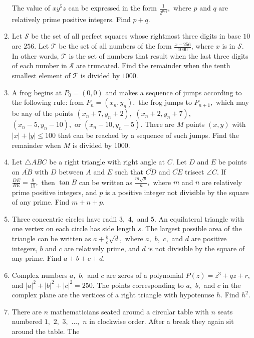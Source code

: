 \documentclass{article}
\begin{document}
\begin{enumerate}[label=\arabic*., itemsep=0.5em]
The value of \(xy^5z\) can be expressed in the form \(\frac{1}{2^{p/q}},\) where \(p\) and \(q\) are relatively prime positive integers. Find \(p+q.\)\par \vspace{0.5em}\item Let \(\mathcal{S}\) be the set of all perfect squares whose rightmost three digits in base \(10\) are \(256\). Let \(\mathcal{T}\) be the set of all numbers of the form \(\frac{x-256}{1000}\), where \(x\) is in \(\mathcal{S}\). In other words, \(\mathcal{T}\) is the set of numbers that result when the last three digits of each number in \(\mathcal{S}\) are truncated. Find the remainder when the tenth smallest element of \(\mathcal{T}\) is divided by \(1000\).\par \vspace{0.5em}\item A frog begins at \(P_0 = (0,0)\) and makes a sequence of jumps according to the following rule: from \(P_n = (x_n, y_n),\) the frog jumps to \(P_{n+1},\) which may be any of the points \((x_n + 7, y_n + 2),\) \((x_n + 2, y_n + 7),\) \((x_n - 5, y_n - 10),\) or \((x_n - 10, y_n - 5).\) There are \(M\) points \((x, y)\) with \(|x| + |y| \le 100\) that can be reached by a sequence of such jumps. Find the remainder when \(M\) is divided by \(1000.\)\par \vspace{0.5em}\item Let \(\triangle ABC\) be a right triangle with right angle at \(C.\) Let \(D\) and \(E\) be points on \(\overline{AB}\) with \(D\) between \(A\) and \(E\) such that \(\overline{CD}\) and \(\overline{CE}\) trisect \(\angle C.\) If \(\frac{DE}{BE} = \frac{8}{15},\) then \(\tan B\) can be written as \(\frac{m \sqrt{p}}{n},\) where \(m\) and \(n\) are relatively prime positive integers, and \(p\) is a positive integer not divisible by the square of any prime. Find \(m+n+p.\)\par \vspace{0.5em}\item Three concentric circles have radii \(3,\) \(4,\) and \(5.\) An equilateral triangle with one vertex on each circle has side length \(s.\) The largest possible area of the triangle can be written as \(a + \tfrac{b}{c} \sqrt{d},\) where \(a,\) \(b,\) \(c,\) and \(d\) are positive integers, \(b\) and \(c\) are relatively prime, and \(d\) is not divisible by the square of any prime. Find \(a+b+c+d.\)\par \vspace{0.5em}\item Complex numbers \(a,\) \(b,\) and \(c\) are zeros of a polynomial \(P(z) = z^3 + qz + r,\) and \(|a|^2 + |b|^2 + |c|^2 = 250.\) The points corresponding to \(a,\) \(b,\) and \(c\) in the complex plane are the vertices of a right triangle with hypotenuse \(h.\) Find \(h^2.\)\par \vspace{0.5em}\item There are \(n\) mathematicians seated around a circular table with \(n\) seats numbered \(1,\) \(2,\) \(3,\) \(...,\) \(n\) in clockwise order. After a break they again sit around the table. The 
\end{enumerate}
\end{document}
